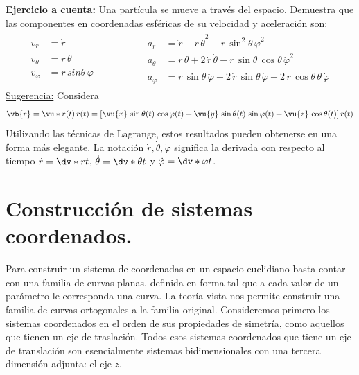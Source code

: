 \textbf{Ejercicio a cuenta:} Una partícula se mueve a través del espacio. Demuestra que las componentes en coordenadas esféricas de su velocidad y aceleración son:
\begin{align*}
\begin{aligned}
v_{r} &= \dot{r} \\
v_{\theta} &= r \, \dot{\theta} \\
v_{\varphi} &= r \, sin \theta \, \dot{\varphi}
\end{aligned}
\hspace{2cm}
\begin{aligned}
a_{r} &= \ddot{r} - r \, \dot{\theta}^{2} - r \, \sin^{2} \theta \, \dot{\varphi}^{2} \\
a_{\theta} &= r \, \ddot{\theta} + 2 \, \dot{r} \, \dot{\theta} - r \, \sin \theta \, \cos \theta \, \dot{\varphi}^{2} \\
a_{\varphi} &= r \, \sin \theta \, \ddot{\varphi} +  2 \, \dot{r} \, \sin \theta \, \dot{\varphi} + 2 \, r \, \cos \theta \, \dot{\theta} \, \dot{\varphi}
\end{aligned}
\end{align*}
\underline{Sugerencia:} Considera
\begin{align*}
\vb{r} = \vu*{r} (t) \, r(t) = [ \vu{x} \, \sin \theta (t)  \, \cos \varphi (t) + \vu{y} \, \sin \theta (t)  \, \sin \varphi (t) + \vu{z} \, \cos \theta (t) ] \, r(t)
\end{align*}
Utilizando las técnicas de Lagrange, estos resultados pueden obtenerse en una forma más elegante. La notación $\dot{r}, \dot{\theta}, \dot{\varphi}$ significa la derivada con respecto al tiempo $\dot{r} = \dv*{r}{t}$, $\dot{\theta} = \dv*{\theta}{t}$ y $\dot{\varphi} = \dv*{\varphi}{t}$.

\section{Construcción de sistemas coordenados.}



Para construir un sistema de coordenadas en un espacio euclidiano basta contar con una familia de curvas planas, definida en forma tal que a cada valor de un parámetro le corresponda una curva. La teoría vista nos permite construir una familia de curvas ortogonales a la familia original. Consideremos primero los sistemas coordenados en el orden de sus propiedades de simetría, como aquellos que tienen un eje de traslación. Todos esos sistemas coordenados que tiene un eje de translación son esencialmente sistemas bidimensionales con una tercera dimensión adjunta: el eje $z$.

